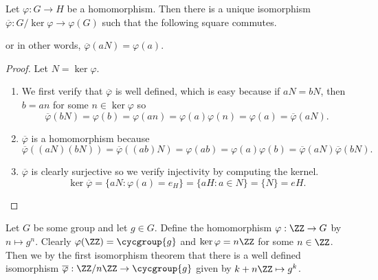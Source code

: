 \begin{thm}
Let $\varphi : G \to H$ be a homomorphism. Then there is a unique
isomorphism $\overline{\varphi} : G / \ker\varphi \to \varphi(G)$ such
that the following square commutes.
\begin{center}
\end{center}
or in other words, $\overline{\varphi}(aN) = \varphi(a)$.
\end{thm}

\begin{proof}
Let $N = \ker\varphi$.
\begin{enumerate}
\item We first verify that $\overline\varphi$ is well defined, which is
easy because if $aN = bN$, then $b = an$ for some $n \in \ker\varphi$ so
\[ \overline\varphi(bN) = \varphi(b) = \varphi(an) =
 \varphi(a)\varphi(n) = \varphi(a) = \overline\varphi(aN). \]
\item $\overline\varphi$ is a homomorphism because
\[ \overline\varphi((aN)(bN)) = \overline\varphi((ab)N) = \varphi(ab) =
\varphi(a)\varphi(b) = \overline\varphi(aN) \overline\varphi(bN). \]
\item $\overline\varphi$ is clearly surjective so we verify injectivity
by computing the kernel.
\[ \ker\overline\varphi = \lbrace aN : \varphi(a) = e_H \rbrace =
\lbrace aH : a \in N \rbrace = \lbrace N \rbrace = eH. \]
\end{enumerate}
\end{proof}

\begin{ex}
Let $G$ be some group and let $g \in G$. Define the homomorphism
$\varphi : \ZZ \to G$ by $n \mapsto g^n$. Clearly $\varphi(\ZZ) =
\cycgroup{g}$ and $\ker\varphi = n\ZZ$ for some $n \in \ZZ$. Then we
by the first isomorphism theorem that there is a well defined
isomorphism $\overline\varphi : \ZZ / n\ZZ \to \cycgroup{g}$ given by
$k + n\ZZ \mapsto g^k$.
\end{ex}
